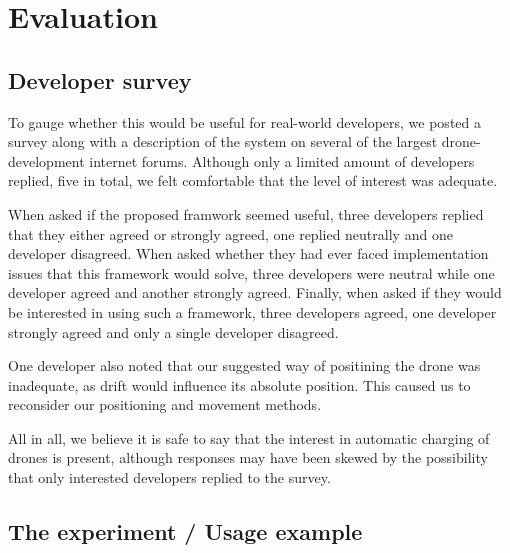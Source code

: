 \section{Evaluation}
\subsection{Developer survey}
To gauge whether this would be useful for real-world developers, we posted a survey along with a description of the system on several of the largest drone-development internet forums. Although only a limited amount of developers replied, five in total, we felt comfortable that the level of interest was adequate. 

When asked if the proposed framwork seemed useful, three developers replied that they either agreed or strongly agreed, one replied neutrally and one developer disagreed. When asked whether they had ever faced implementation issues that this framework would solve, three developers were neutral while one developer agreed and another strongly agreed. Finally, when asked if they would be interested in using such a framework, three developers agreed, one developer strongly agreed and only a single developer disagreed.

One developer also noted that our suggested way of positining the drone was inadequate, as drift would influence its absolute position. This caused us to reconsider our positioning and movement methods.

All in all, we believe it is safe to say that the interest in automatic charging of drones is present, although  responses may have been skewed by the possibility that only interested developers replied to the survey.

\subsection{The experiment / Usage example}
